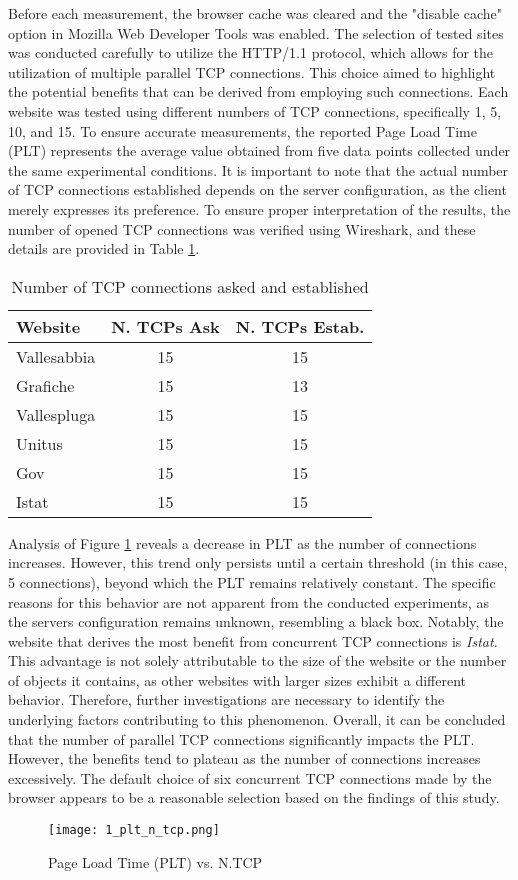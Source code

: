 Before each measurement, the browser cache was cleared and the "disable cache" option in Mozilla Web Developer Tools was enabled. 
The selection of tested sites was conducted carefully to utilize the HTTP/1.1 protocol, which allows for the utilization of multiple parallel TCP connections. 
This choice aimed to highlight the potential benefits that can be derived from employing such connections. Each website was tested using different numbers of 
TCP connections, specifically 1, 5, 10, and 15. To ensure accurate measurements, the reported Page Load Time (PLT) represents the average value obtained 
from five data points collected under the same experimental conditions.
It is important to note that the actual number of TCP connections established depends on the server configuration, as the client merely expresses its preference. 
To ensure proper interpretation of the results, the number of opened TCP connections was verified using Wireshark, and these details are provided 
in Table \ref{tab:TCP_asked}.

    \begin{table}[H]
        \small
    \centering
        \begin{tabular}{|l|c|c|}
        \hline
        \rowcolor{pyblue!60}
        \textbf{Website} & \textbf{N. TCPs Ask} & \textbf{N. TCPs Estab.} \\
        \hline
        Vallesabbia & 15 & 15 \\
        Grafiche & 15 & 13 \\
        Vallespluga & 15 & 15 \\
        Unitus & 15 & 15 \\
        Gov & 15 & 15 \\
        Istat & 15 & 15 \\
        \hline
        \end{tabular}
        \caption{\small Number of TCP connections asked and established}
        \label{tab:TCP_asked}
    \end{table}

Analysis of Figure \ref{fig:plt_n_tcp} reveals a decrease in PLT as the number of connections increases. However, this trend only persists until a certain threshold 
(in this case, 5 connections), beyond which the PLT remains relatively constant. The specific reasons for this behavior are not apparent from the conducted 
experiments, as the servers configuration remains unknown, resembling a black box. Notably, the website that derives the most benefit from concurrent TCP 
connections is \textit{Istat}. This advantage is not solely attributable to the size of the website or the number of objects it contains, as other 
websites with larger sizes exhibit a different behavior. Therefore, further investigations are necessary to identify the underlying factors contributing 
to this phenomenon.
Overall, it can be concluded that the number of parallel TCP connections significantly impacts the PLT. However, the benefits tend to plateau as the number of 
connections increases excessively. The default choice of six concurrent TCP connections made by the browser appears to be a reasonable selection based on the 
findings of this study.
    
    \begin{figure}[H]
        \centering
        \texttt{[image: 1\_plt\_n\_tcp.png]}
        \caption{\small Page Load Time (PLT) vs. N.TCP}
        \label{fig:plt_n_tcp}
    \end{figure}



